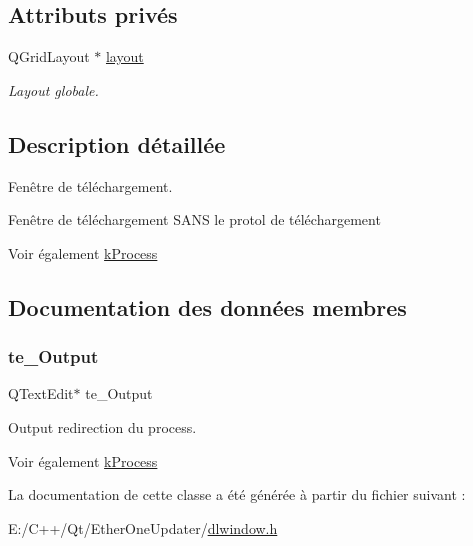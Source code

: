 \subsection*{Attributs privés}
\begin{DoxyCompactItemize}
\item 
\mbox{\label{classdlWindow_a3dcd7d9704d0284fd91442e4cc1ec721}} 
Q\+Grid\+Layout $\ast$ \hyperlink{classdlWindow_a3dcd7d9704d0284fd91442e4cc1ec721}{layout}
\begin{DoxyCompactList}\small\item\em Layout globale. \end{DoxyCompactList}\end{DoxyCompactItemize}


\subsection{Description détaillée}
Fenêtre de téléchargement. 

Fenêtre de téléchargement S\+A\+NS le protol de téléchargement

\begin{DoxySeeAlso}{Voir également}
\hyperlink{classkProcess}{k\+Process} 
\end{DoxySeeAlso}


\subsection{Documentation des données membres}
\mbox{\label{classdlWindow_a535fc30f750e2969928630165600d8cc}} 
\subsubsection{\texorpdfstring{te\+\_\+\+Output}{te\_Output}}
{\footnotesize\ttfamily Q\+Text\+Edit$\ast$ te\+\_\+\+Output}



Output redirection du process. 

\begin{DoxySeeAlso}{Voir également}
\hyperlink{classkProcess}{k\+Process} 
\end{DoxySeeAlso}


La documentation de cette classe a été générée à partir du fichier suivant \+:\begin{DoxyCompactItemize}
\item 
E\+:/\+C++/\+Qt/\+Ether\+One\+Updater/\hyperlink{dlwindow_8h}{dlwindow.\+h}\end{DoxyCompactItemize}
